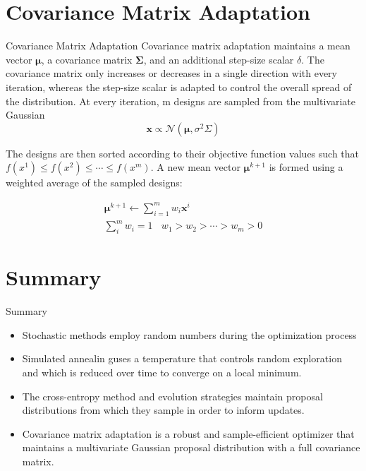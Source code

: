 \documentclass{beamer}
\begin{document}
\section{Covariance Matrix Adaptation}
\begin{frame}{Covariance Matrix Adaptation}
Covariance matrix adaptation maintains a mean vector $\boldsymbol{\mu}$, a covariance matrix $\boldsymbol{\Sigma}$, and an additional step-size scalar $\delta$. The covariance matrix only increases or decreases in a single direction with every iteration, whereas the step-size scalar is adapted to control the overall spread of the distribution. At every iteration, m designs are sampled from the multivariate Gaussian
\begin{equation*}
    \boldsymbol{x} \propto \mathcal{N} (\boldsymbol{\mu}, \sigma^2 \Sigma)
\end{equation*}

The designs are then sorted according to their objective function values such that $f(x^1) \leq f(x^2) \leq \cdots \leq f(x^m)$. A new mean vector  $\boldsymbol{\mu}^{k+1}$ is formed using a weighted average of the sampled designs:

\begin{gather*}
    \boldsymbol{\mu}^{k+1} \leftarrow \sum_{i=1}^m w_i \boldsymbol{x}^i\\
    \sum_i^m w_i = 1 ~~~~ w_1>w_2>\cdots>w_m>0    
\end{gather*}

\end{frame}


\section{Summary}
\begin{frame}{Summary}
    \begin{itemize}
        \item Stochastic methods employ random numbers during the optimization process
        \item Simulated annealin guses a temperature that controls random exploration and which is reduced over time to converge on a local minimum.
        \item The cross-entropy method and evolution strategies maintain proposal distributions from which they sample in order to inform updates.
        \item Covariance matrix adaptation is a robust and sample-efficient optimizer that maintains a multivariate Gaussian proposal distribution with a full covariance matrix.
    \end{itemize}
\end{frame}
\end{document}
